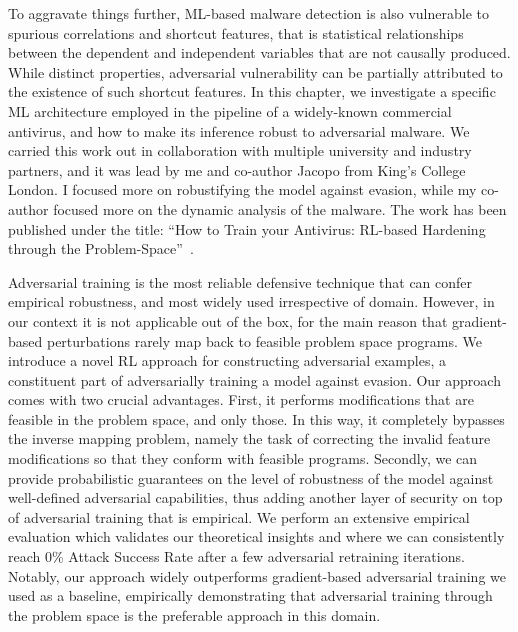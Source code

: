 To aggravate things further, ML-based malware detection is also vulnerable to spurious correlations and shortcut features, that is statistical relationships between the dependent and independent variables that are not causally produced.
While distinct properties, adversarial vulnerability can be partially attributed to the existence of such shortcut features.
In this chapter, we investigate a specific ML architecture employed in the pipeline of a widely-known commercial antivirus, and how to make its inference robust to adversarial malware.
We carried this work out in collaboration with multiple university and industry partners, and it was lead by me and co-author Jacopo from King's College London.
I focused more on robustifying the model against evasion, while my co-author focused more on the dynamic analysis of the malware.
The work has been published under the title: ``How to Train your Antivirus: RL-based Hardening through the Problem-Space''~\cite{tsingenopoulos2024train}.

Adversarial training is the most reliable defensive technique that can confer empirical robustness, and most widely used irrespective of domain. 
However, in our context it is not applicable out of the box, for the main reason that gradient-based perturbations rarely map back to feasible problem space programs. 
We introduce a novel \gls{RL} approach for constructing adversarial examples, a constituent part of adversarially training a model against evasion.
Our approach comes with two crucial advantages.
First, it performs modifications that are feasible in the problem space, and only those.
In this way, it completely bypasses the inverse mapping problem, namely the task of correcting the invalid feature modifications so that they conform with feasible programs.
Secondly, we can provide probabilistic guarantees on the level of robustness of the model against well-defined adversarial capabilities, thus adding another layer of security on top of adversarial training that is empirical.
We perform an extensive empirical evaluation which validates our theoretical insights and where we can consistently reach 0\% Attack Success Rate after a few adversarial retraining iterations.
Notably, our approach widely outperforms gradient-based adversarial training we used as a baseline, empirically demonstrating that adversarial training through the problem space is the preferable approach in this domain.


